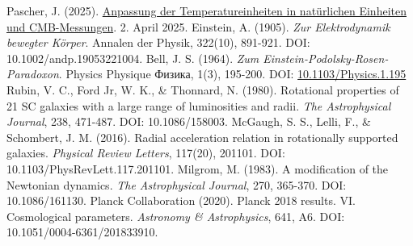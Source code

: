 \documentclass[12pt,a4paper]{article}
\begin{document}
\begin{thebibliography}{99}
		 Pascher, J. (2025). \href{https://github.com/jpascher/T0-Time-Mass-Duality/tree/main/2/pdf/Deutsch/TempEinheitenCMB.pdf}{Anpassung der Temperatureinheiten in natürlichen Einheiten und CMB-Messungen}. 2. April 2025.
		 Einstein, A. (1905). \textit{Zur Elektrodynamik bewegter Körper}. Annalen der Physik, 322(10), 891-921. DOI: 10.1002/andp.19053221004.
		 Bell, J. S. (1964). \textit{Zum Einstein-Podolsky-Rosen-Paradoxon}. Physics Physique {\selectfont Физика}, 1(3), 195-200. DOI: \href{https://doi.org/10.1103/Physics.1.195}{10.1103/Physics.1.195}
		 Rubin, V. C., Ford Jr, W. K., \& Thonnard, N. (1980). Rotational properties of 21 SC galaxies with a large range of luminosities and radii. \textit{The Astrophysical Journal}, 238, 471-487. DOI: 10.1086/158003.
		 McGaugh, S. S., Lelli, F., \& Schombert, J. M. (2016). Radial acceleration relation in rotationally supported galaxies. \textit{Physical Review Letters}, 117(20), 201101. DOI: 10.1103/PhysRevLett.117.201101.
		 Milgrom, M. (1983). A modification of the Newtonian dynamics. \textit{The Astrophysical Journal}, 270, 365-370. DOI: 10.1086/161130.
		 Planck Collaboration (2020). Planck 2018 results. VI. Cosmological parameters. \textit{Astronomy \& Astrophysics}, 641, A6. DOI: 10.1051/0004-6361/201833910.
	\end{thebibliography}
	
\end{document}
